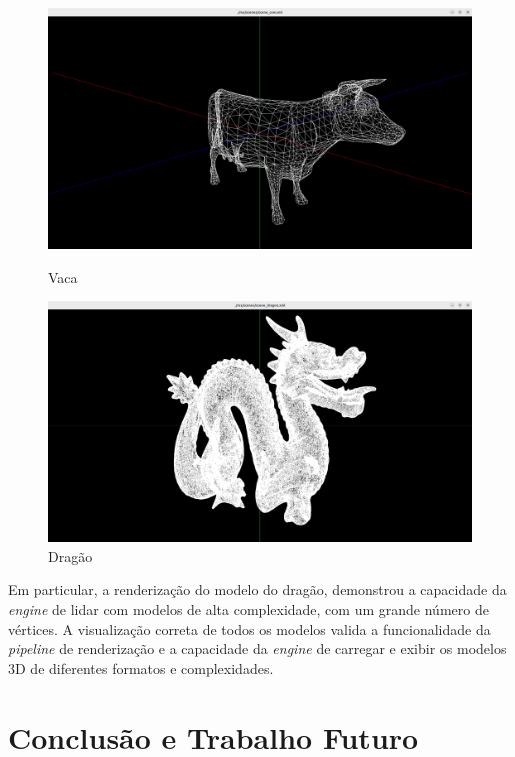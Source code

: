 \documentclass[12pt, a4paper]{article}
\begin{document}
\begin{figure}[h]
    \centering
    \begin{minipage}{0.48\textwidth}
        \centering
        \includegraphics[width=\textwidth]{res/results/Cow.png}
        \caption{Vaca}
        \label{fig:imageCow}
    \end{minipage}\hfill
    \begin{minipage}{0.48\textwidth}
        \centering
        \includegraphics[width=\textwidth]{res/results/Dragon.png}
        \caption{Dragão}
        \label{fig:imageDragon}
    \end{minipage}
\end{figure}

Em particular, a renderização do modelo do dragão, demonstrou a capacidade da \emph{engine} de
lidar com modelos de alta complexidade, com um grande número de vértices. A visualização correta de
todos os modelos valida a funcionalidade da \emph{pipeline} de renderização e a capacidade da
\emph{engine} de carregar e exibir os modelos 3D de diferentes formatos e complexidades.

\section{Conclusão e Trabalho Futuro}
\end{document}
